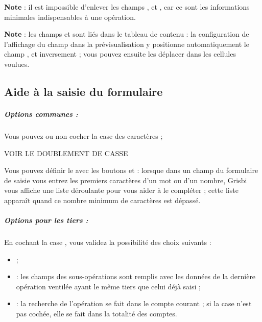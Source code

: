 \textbf{Note} : il est impossible d'enlever les champs  ,  et , car ce sont les informations minimales indispensables à une opération.

\textbf{Note} : les champs  et  sont liés dans le tableau de contenu : la configuration de l'affichage du champ  dans la prévisualisation y positionne automatiquement le champ , et inversement ; vous pouvez ensuite les déplacer dans les cellules voulues.


\subsection{Aide à la saisie du formulaire\label{setup-form-help}}


\subparagraph{Options communes :\label{setup-form-help-common}}

Vous pouvez ou non cocher la case   des caractères ;

VOIR LE DOUBLEMENT DE CASSE

Vous pouvez définir le  avec les boutons \menu{+} et \menu{-} : lorsque dans un champ du formulaire de saisie vous entrez les premiers caractères d'un mot ou d'un nombre, Grisbi vous affiche une liste déroulante pour vous aider à le compléter ; cette liste apparaît quand ce nombre minimum de caractères est dépassé.

\subparagraph{Options pour les tiers :\label{setup-form-help-third}}

En cochant la case , vous validez la possibilité des choix suivants :

\begin{itemize}
	\item {} ;
	\item {} : les champs des sous-opérations sont remplis avec les données de la dernière opération ventilée ayant le même tiers que celui déjà saisi ;
	\item {} : la recherche de l'opération se fait dans le compte courant ; si la case n'est pas cochée, elle se fait dans la totalité des comptes.
\end{itemize}

